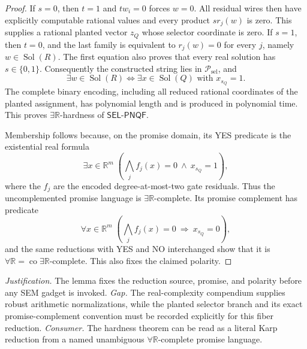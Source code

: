 \documentclass{article}
\begin{document}
\begin{proof}
If \(s=0\), then \(t=1\) and \(tw_i=0\) forces \(w=0\).  All residual wires then have explicitly computable rational values and every product \(s r_j(w)\) is zero.  This supplies a rational planted vector \(z_Q\) whose selector coordinate is zero.  If \(s=1\), then \(t=0\), and the last family is equivalent to \(r_j(w)=0\) for every \(j\), namely \(w\in\operatorname{Sol}(R)\).  The first equation also proves that every real solution has \(s\in\{0,1\}\).  Consequently the constructed string lies in \(\mathcal P_{\mathrm{sel}}\), and
\[
\exists w\in\operatorname{Sol}(R)
\Longleftrightarrow
\exists x\in\operatorname{Sol}(Q)\text{ with }x_{s_Q}=1.
\]
The complete binary encoding, including all reduced rational coordinates of the planted assignment, has polynomial length and is produced in polynomial time.  This proves \(\exists\mathbb R\)-hardness of \(\mathsf{SEL\mbox{-}PNQF}\).

Membership follows because, on the promise domain, its YES predicate is the existential real formula
\[
\exists x\in\mathbb R^m\;\left(\bigwedge_j f_j(x)=0\ \land\ x_{s_Q}=1\right),
\]
where the \(f_j\) are the encoded degree-at-most-two gate residuals.  Thus the uncomplemented promise language is \(\exists\mathbb R\)-complete.  Its promise complement has predicate
\[
\forall x\in\mathbb R^m\;\left(\bigwedge_j f_j(x)=0\ \Longrightarrow\ x_{s_Q}=0\right),
\]
and the same reductions with YES and NO interchanged show that it is \(\forall\mathbb R=\operatorname{co}\exists\mathbb R\)-complete.  This also fixes the claimed polarity.
\end{proof}
\par\smallskip\noindent \textit{Justification.} The lemma fixes the reduction source, promise, and polarity before any SEM gadget is invoked. \textit{Gap.} The real-complexity compendium supplies robust arithmetic normalizations, while the planted selector branch and its exact promise-complement convention must be recorded explicitly for this fiber reduction. \textit{Consumer.} The hardness theorem can be read as a literal Karp reduction from a named unambiguous \(\forall\mathbb R\)-complete promise language.
\end{document}
